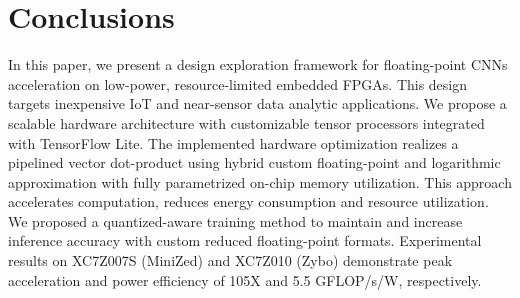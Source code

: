 \section{Conclusions}
\label{sec:conclusions}
In this paper, we present a design exploration framework for floating-point CNNs acceleration on low-power, resource-limited embedded FPGAs. This design targets inexpensive IoT and near-sensor data analytic applications. We propose a scalable hardware architecture with customizable tensor processors integrated with TensorFlow Lite. The implemented hardware optimization realizes a pipelined vector dot-product using hybrid custom floating-point and logarithmic approximation with fully parametrized on-chip memory utilization. This approach accelerates computation, reduces energy consumption and resource utilization. We proposed a quantized-aware training method to maintain and increase inference accuracy with custom reduced floating-point formats. Experimental results on XC7Z007S (MiniZed) and XC7Z010 (Zybo) demonstrate peak acceleration and power efficiency of 105X and 5.5 GFLOP/s/W, respectively.